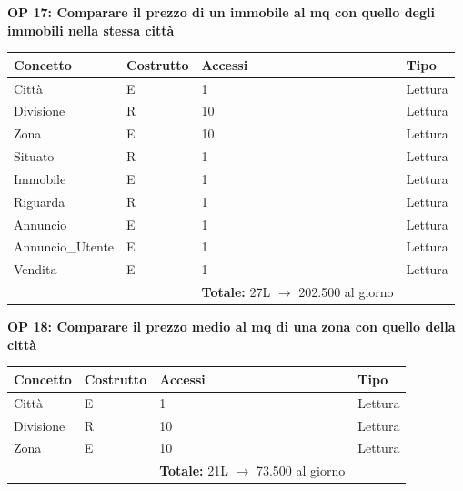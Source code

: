 \documentclass[a4paper,12pt]{report}
\begin{document}
            \textbf{OP 17: Comparare il prezzo di un immobile al mq con quello degli immobili nella stessa città}
        	\begin{table}[H]
            \centering
             \begin{tabular}{llll}
             \rowcolor{yellow!20} \textbf{Concetto} & \textbf{Costrutto} & \textbf{Accessi} & \textbf{Tipo}\\ [0.5ex] 
             \hline
             Città & E & 1 & Lettura \\ 
             Divisione & R & 10 & Lettura \\ 
             Zona & E & 10 & Lettura \\ 
             Situato & R & 1 & Lettura \\ 
             Immobile & E & 1 & Lettura \\ 
             Riguarda & R & 1 & Lettura \\ 
             Annuncio & E & 1 & Lettura \\ 
             Annuncio\_Utente & E & 1 & Lettura \\ 
             Vendita & E & 1 & Lettura \\ 

             \hline
                \rowcolor{yellow!20} &   & \textbf{Totale:} 27L $\rightarrow$ 202.500 al giorno &  \\ [1ex] 
             
             \end{tabular}
            \end{table}
            
            \textbf{OP 18: Comparare il prezzo medio al mq di una zona con quello della città}
        	\begin{table}[H]
            \centering
             \begin{tabular}{llll}
             \rowcolor{yellow!20} \textbf{Concetto} & \textbf{Costrutto} & \textbf{Accessi} & \textbf{Tipo}\\ [0.5ex] 
             \hline
             Città & E & 1 & Lettura \\ 
             Divisione & R & 10 & Lettura \\ 
             Zona & E & 10 & Lettura \\ 
             \hline
                \rowcolor{yellow!20} &   & \textbf{Totale:} 21L $\rightarrow$ 73.500 al giorno &  \\ [1ex] 
             
             \end{tabular}
            \end{table}
\end{document}
